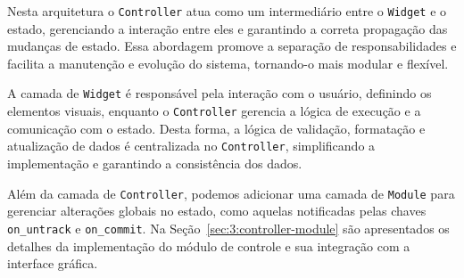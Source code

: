 Nesta arquitetura o \texttt{Controller} atua como um intermediário entre o \texttt{Widget} e o estado, gerenciando a interação entre eles e garantindo a correta propagação das mudanças de estado. Essa abordagem promove a separação de responsabilidades e facilita a manutenção e evolução do sistema, tornando-o mais modular e flexível.

A camada de \texttt{Widget} é responsável pela interação com o usuário, definindo os elementos visuais, enquanto o \texttt{Controller} gerencia a lógica de execução e a comunicação com o estado. Desta forma, a lógica de validação, formatação e atualização de dados é centralizada no \texttt{Controller}, simplificando a implementação e garantindo a consistência dos dados.

Além da camada de \texttt{Controller}, podemos adicionar uma camada de \texttt{Module} para gerenciar alterações globais no estado, como aquelas notificadas pelas chaves \texttt{on\_untrack} e \texttt{on\_commit}. Na Seção~\ref{sec:3:controller-module} são apresentados os detalhes da implementação do módulo de controle e sua integração com a interface gráfica.

